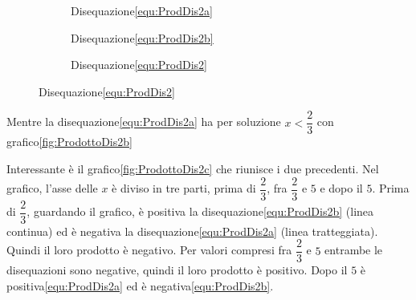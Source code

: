 \begin{figure}
	\centering
	\begin{subfigure}[b]{.4\linewidth}
		\caption{Disequazione\nobs\vref{equ:ProdDis2a}}
		\label{fig:ProdottoDis2a}
	\end{subfigure}%
	\centering
	\begin{subfigure}[b]{.4\linewidth}
		\centering
		\caption{Disequazione\nobs\vref{equ:ProdDis2b}}
		\label{fig:ProdottoDis2b}
	\end{subfigure}%
		\qquad\qquad\centering
		\begin{subfigure}[b]{.4\linewidth}
			\centering
			\caption{Disequazione\nobs\vref{equ:ProdDis2}}
			\label{fig:ProdottoDis2c}
		\end{subfigure}%
		\captionsetup{format=grafico,list=no}
	\caption{Disequazione\nobs\vref{equ:ProdDis2}}
\end{figure}

Mentre la  disequazione\nobs\vref{equ:ProdDis2a} ha per soluzione $x<\dfrac{2}{3}$ con grafico\nobs\vref{fig:ProdottoDis2b}
 
Interessante è il grafico\nobs\vref{fig:ProdottoDis2c} che riunisce i due precedenti. Nel grafico, l'asse delle $x$ è diviso in tre parti, prima di $\dfrac{2}{3}$, fra $\dfrac{2}{3}$ e $5$ e dopo il $5$. Prima di $\dfrac{2}{3}$, guardando il grafico,  è positiva la disequazione\nobs\vref{equ:ProdDis2b} (linea continua)  ed è negativa la disequazione\nobs\vref{equ:ProdDis2a} (linea tratteggiata). Quindi il loro prodotto è negativo. Per valori compresi fra $\dfrac{2}{3}$ e $5$ entrambe le disequazioni  sono negative, quindi il loro prodotto è positivo. Dopo il $5$ è positiva\nobs\vref{equ:ProdDis2a} ed è negativa\nobs\vref{equ:ProdDis2b}. 

